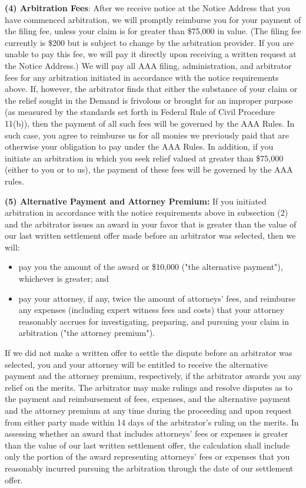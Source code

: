 \textbf{(4) Arbitration Fees}: After we receive notice at the Notice
Address that you have commenced arbitration, we will promptly reimburse
you for your payment of the filing fee, unless your claim is for greater
than \$75,000 in value. (The filing fee currently is \$200 but is
subject to change by the arbitration provider. If you are unable to pay
this fee, we will pay it directly upon receiving a written request at
the Notice Address.) We will pay all AAA filing, administration, and
arbitrator fees for any arbitration initiated in accordance with the
notice requirements above. If, however, the arbitrator finds that either
the substance of your claim or the relief sought in the Demand is
frivolous or brought for an improper purpose (as measured by the
standards set forth in Federal Rule of Civil Procedure 11(b)), then the
payment of all such fees will be governed by the AAA Rules. In such
case, you agree to reimburse us for all monies we previously paid that
are otherwise your obligation to pay under the AAA Rules. In addition,
if you initiate an arbitration in which you seek relief valued at
greater than \$75,000 (either to you or to us), the payment of these
fees will be governed by the AAA rules.

\textbf{(5) Alternative Payment and Attorney Premium:} If you initiated
arbitration in accordance with the notice requirements above in
subsection (2) and the arbitrator issues an award in your favor that is
greater than the value of our last written settlement offer made before
an arbitrator was selected, then we will:

\begin{itemize}
\tightlist
\item
  pay you the amount of the award or \$10,000 ("the alternative
  payment"), whichever is greater; and
\item
  pay your attorney, if any, twice the amount of attorneys' fees, and
  reimburse any expenses (including expert witness fees and costs) that
  your attorney reasonably accrues for investigating, preparing, and
  pursuing your claim in arbitration ("the attorney premium").
\end{itemize}

If we did not make a written offer to settle the dispute before an
arbitrator was selected, you and your attorney will be entitled to
receive the alternative payment and the attorney premium, respectively,
if the arbitrator awards you any relief on the merits. The arbitrator
may make rulings and resolve disputes as to the payment and
reimbursement of fees, expenses, and the alternative payment and the
attorney premium at any time during the proceeding and upon request from
either party made within 14 days of the arbitrator's ruling on the
merits. In assessing whether an award that includes attorneys' fees or
expenses is greater than the value of our last written settlement offer,
the calculation shall include only the portion of the award representing
attorneys' fees or expenses that you reasonably incurred pursuing the
arbitration through the date of our settlement offer.

